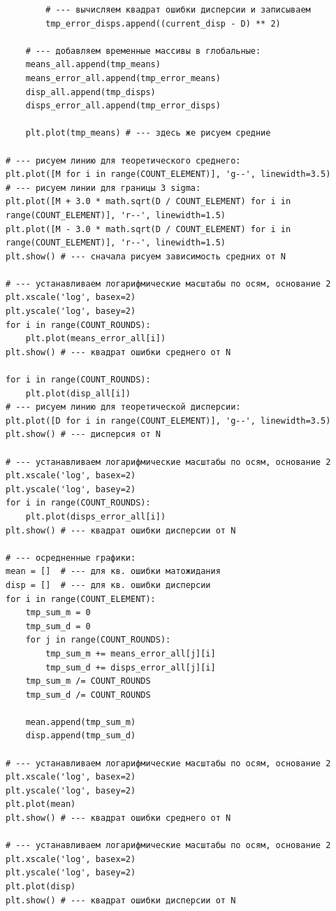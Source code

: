\documentclass[a4paper,12pt,answers,noaddpoints]{exam}
\begin{document}
\begin{verbatim}
        # --- вычисляем квадрат ошибки дисперсии и записываем
        tmp_error_disps.append((current_disp - D) ** 2)

    # --- добавляем временные массивы в глобальные:
    means_all.append(tmp_means)
    means_error_all.append(tmp_error_means)
    disp_all.append(tmp_disps)
    disps_error_all.append(tmp_error_disps)

    plt.plot(tmp_means) # --- здесь же рисуем средние

# --- рисуем линию для теоретического среднего:
plt.plot([M for i in range(COUNT_ELEMENT)], 'g--', linewidth=3.5)
# --- рисуем линии для границы 3 sigma:
plt.plot([M + 3.0 * math.sqrt(D / COUNT_ELEMENT) for i in range(COUNT_ELEMENT)], 'r--', linewidth=1.5)
plt.plot([M - 3.0 * math.sqrt(D / COUNT_ELEMENT) for i in range(COUNT_ELEMENT)], 'r--', linewidth=1.5)
plt.show() # --- cначала рисуем зависимость средних от N

# --- устанавливаем логарифмические масштабы по осям, основание 2
plt.xscale('log', basex=2)
plt.yscale('log', basey=2)
for i in range(COUNT_ROUNDS):
    plt.plot(means_error_all[i])
plt.show() # --- квадрат ошибки среднего от N

for i in range(COUNT_ROUNDS):
    plt.plot(disp_all[i])
# --- рисуем линию для теоретической дисперсии:
plt.plot([D for i in range(COUNT_ELEMENT)], 'g--', linewidth=3.5)
plt.show() # --- дисперсия от N

# --- устанавливаем логарифмические масштабы по осям, основание 2
plt.xscale('log', basex=2)
plt.yscale('log', basey=2)
for i in range(COUNT_ROUNDS):
    plt.plot(disps_error_all[i])
plt.show() # --- квадрат ошибки дисперсии от N

# --- осредненные графики:
mean = []  # --- для кв. ошибки матожидания
disp = []  # --- для кв. ошибки дисперсии
for i in range(COUNT_ELEMENT):
    tmp_sum_m = 0
    tmp_sum_d = 0
    for j in range(COUNT_ROUNDS):
        tmp_sum_m += means_error_all[j][i]
        tmp_sum_d += disps_error_all[j][i]
    tmp_sum_m /= COUNT_ROUNDS
    tmp_sum_d /= COUNT_ROUNDS

    mean.append(tmp_sum_m)
    disp.append(tmp_sum_d)

# --- устанавливаем логарифмические масштабы по осям, основание 2
plt.xscale('log', basex=2)
plt.yscale('log', basey=2)
plt.plot(mean)
plt.show() # --- квадрат ошибки среднего от N

# --- устанавливаем логарифмические масштабы по осям, основание 2
plt.xscale('log', basex=2)
plt.yscale('log', basey=2)
plt.plot(disp)
plt.show() # --- квадрат ошибки дисперсии от N
\end{verbatim}
\end{document}
